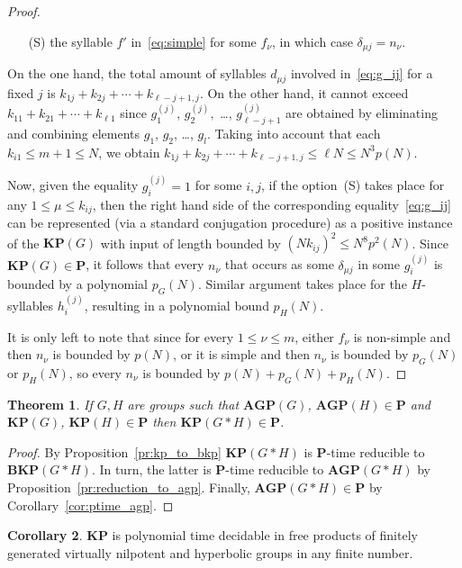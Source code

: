 \documentclass[10pt]{amsart}
\newtheorem{theorem}{Theorem}[section]
\theoremstyle{definition}
\newtheorem{corollary}[theorem]{Corollary}
\def\P{{\mathbf{P}}}
\def\BKP{{\mathbf{BKP}}}
\def\KP{{\mathbf{KP}}}
\def\AGP{{\mathbf{AGP}}}
\begin{document}
\begin{proof}
\begin{itemize}
\item[(S)]\label{li:simple} the syllable $f'$ in~\eqref{eq:simple} for some $f_\nu$, in which case $\delta_{\mu j}=n_\nu$.
\end{itemize}
On the one hand, the total amount of syllables $d_{\mu j}$ involved in~\eqref{eq:g_ij} for a fixed $j$ is $k_{1j}+k_{2j}+\cdots +k_{\ell-j+1,j}$. On the other hand, it cannot exceed $k_{11}+k_{21}+\cdots +k_{\ell 1}$
since $g_1^{(j)}$, $g_2^{(j)},$ \ldots, $g_{\ell-j+1}^{(j)}$ are obtained by eliminating and combining elements $g_1$, $g_2$, \ldots, $g_l$. Taking into account that each $k_{i1}\le m+1\le N$, we obtain $k_{1j}+k_{2j}+\cdots +k_{\ell-j+1,j}\le \ell N\le N^3p(N)$.



Now, given the equality $g_i^{(j)}=1$ for some $i,j$, if the option~(S) takes place for any $1\le \mu\le k_{ij}$, then the right hand side of the corresponding equality~\eqref{eq:g_ij} can be represented (via a standard conjugation procedure) as a positive instance of the $\KP(G)$ with input of length bounded by $(N k_{ij})^2\le N^8p^2(N)$. Since $\KP(G)\in\P$, it follows that every $n_\nu$ that occurs as some $\delta_{\mu j}$ in some $g_i^{(j)}$ is bounded by a polynomial $p_G(N)$. Similar argument takes place for the $H$-syllables $h_i^{(j)}$, resulting in a polynomial bound $p_H(N)$.

It is only left to note that since for every $1\le \nu\le m$, either $f_\nu$ is non-simple and then $n_\nu$ is bounded by $p(N)$, or it is simple and then $n_\nu$ is bounded by $p_G(N)$ or $p_H(N)$, so every $n_\nu$ is bounded by $p(N)+p_G(N)+p_H(N)$.
\end{proof}

\begin{theorem}\label{th:ptime_kp}
If $G,H$ are groups such that $\AGP(G)$, $\AGP(H)\in\P$ and $\KP(G)$, $\KP(H)\in\P$ then $\KP(G*H)\in\P$.
\end{theorem}
\begin{proof} By Proposition~\ref{pr:kp_to_bkp} $\KP(G*H)$ is $\P$-time reducible to $\BKP(G*H)$. In turn, the latter is $\P$-time reducible to $\AGP(G*H)$ by Proposition~\ref{pr:reduction_to_agp}. Finally, $\AGP(G*H)\in\P$ by Corollary~\ref{cor:ptime_agp}.
\end{proof}
\begin{corollary}
$\KP$ is polynomial time decidable in free products of finitely generated virtually nilpotent and hyperbolic groups in any finite number.
\end{corollary}

%

\end{document}
